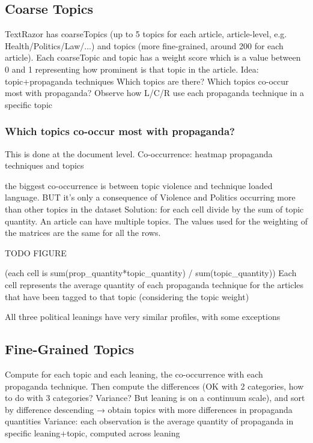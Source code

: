 \subsection{Coarse Topics}

TextRazor has coarseTopics (up to 5 topics for each article, article-level, e.g. Health/Politics/Law/...) and topics (more fine-grained, around 200 for each article). Each coarseTopic and topic has a weight score which is a value between 0 and 1 representing how prominent is that topic in the article.
Idea: topic+propaganda techniques
Which topics are there?
Which topics co-occur most with propaganda?
Observe how L/C/R use each propaganda technique in a specific topic



\subsubsection{Which topics co-occur most with propaganda?}
This is done at the document level.
Co-occurrence: heatmap propaganda techniques and topics

the biggest co-occurrence is between topic violence and technique loaded language.
BUT it’s only a consequence of Violence and Politics occurring more than other topics in the dataset
Solution: for each cell divide by the sum of topic quantity. An article can have multiple topics. The values used for the weighting of the matrices are the same for all the rows.

TODO FIGURE

(each cell is sum(prop\_quantity*topic\_quantity) / sum(topic\_quantity))
Each cell represents the average quantity of each propaganda technique for the articles that have been tagged to that topic (considering the topic weight)


All three political leanings have very similar profiles, with some exceptions





\subsection{Fine-Grained Topics}

Compute for each topic and each leaning, the co-occurrence with each propaganda technique. Then compute the differences (OK with 2 categories, how to do with 3 categories? Variance? But leaning is on a continuum scale), and sort by difference descending → obtain topics with more differences in propaganda quantities
Variance: each observation is the average quantity of propaganda in specific leaning+topic, computed across leaning



